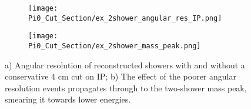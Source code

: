 \begin{figure}[H]
\centering
  \begin{subfigure}[t]{0.25\textwidth}
    \centering
\texttt{[image: Pi0\_Cut\_Section/ex\_2shower\_angular\_res\_IP.png]}
  \caption{ }
  \end{subfigure} 
  \hspace{40mm}
  \begin{subfigure}[t]{0.25\textwidth}
    \centering
\texttt{[image: Pi0\_Cut\_Section/ex\_2shower\_mass\_peak.png]}
  \caption{ }
  \end{subfigure} 
\caption{ a) Angular resolution of reconstructed showers with and without a conservative 4 cm cut on IP; b) The effect of the poorer angular resolution events propagates through to the two-shower mass peak, smearing it towards lower energies. }
\label{fig:ex_cutjust_IP}
\end{figure}

